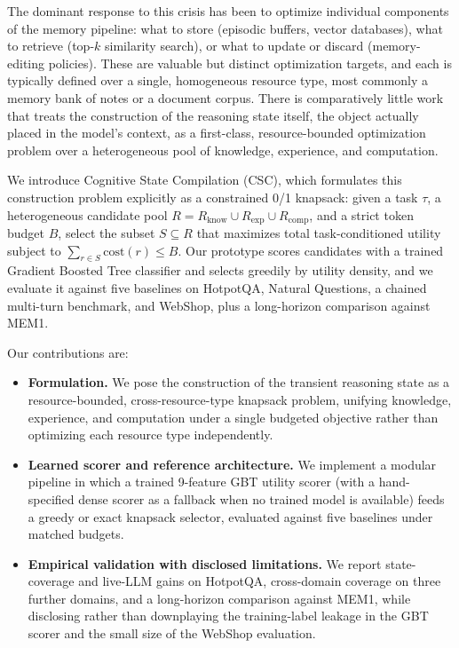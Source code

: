 \documentclass{article}
\begin{document}
The dominant response to this crisis has been to optimize individual components of the memory pipeline: what to store (episodic buffers, vector databases), what to retrieve (top-$k$ similarity search), or what to update or discard (memory-editing policies). These are valuable but distinct optimization targets, and each is typically defined over a single, homogeneous resource type, most commonly a memory bank of notes or a document corpus. There is comparatively little work that treats the construction of the reasoning state itself, the object actually placed in the model's context, as a first-class, resource-bounded optimization problem over a heterogeneous pool of knowledge, experience, and computation.

We introduce Cognitive State Compilation (CSC), which formulates this construction problem explicitly as a constrained 0/1 knapsack: given a task $\tau$, a heterogeneous candidate pool $R = R_{\text{know}} \cup R_{\text{exp}} \cup R_{\text{comp}}$, and a strict token budget $B$, select the subset $S \subseteq R$ that maximizes total task-conditioned utility subject to $\sum_{r \in S} \text{cost}(r) \leq B$. Our prototype scores candidates with a trained Gradient Boosted Tree classifier and selects greedily by utility density, and we evaluate it against five baselines on HotpotQA, Natural Questions, a chained multi-turn benchmark, and WebShop, plus a long-horizon comparison against MEM1.

Our contributions are:
\begin{itemize}
\item \textbf{Formulation.} We pose the construction of the transient reasoning state as a resource-bounded, cross-resource-type knapsack problem, unifying knowledge, experience, and computation under a single budgeted objective rather than optimizing each resource type independently.
\item \textbf{Learned scorer and reference architecture.} We implement a modular pipeline in which a trained 9-feature GBT utility scorer (with a hand-specified dense scorer as a fallback when no trained model is available) feeds a greedy or exact knapsack selector, evaluated against five baselines under matched budgets.
\item \textbf{Empirical validation with disclosed limitations.} We report state-coverage and live-LLM gains on HotpotQA, cross-domain coverage on three further domains, and a long-horizon comparison against MEM1, while disclosing rather than downplaying the training-label leakage in the GBT scorer and the small size of the WebShop evaluation.
\end{itemize}
\end{document}
